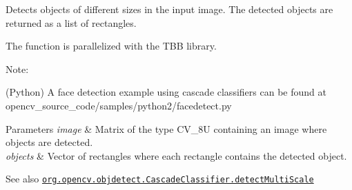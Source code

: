 Detects objects of different sizes in the input image. The detected objects are returned as a list of rectangles.

The function is parallelized with the T\+BB library.

Note\+:


\begin{DoxyItemize}
\item (Python) A face detection example using cascade classifiers can be found at opencv\+\_\+source\+\_\+code/samples/python2/facedetect.\+py 
\end{DoxyItemize}


\begin{DoxyParams}{Parameters}
{\em image} & Matrix of the type {\ttfamily C\+V\+\_\+8U} containing an image where objects are detected. \\
\hline
{\em objects} & Vector of rectangles where each rectangle contains the detected object.\\
\hline
\end{DoxyParams}
\begin{DoxySeeAlso}{See also}
\href{http://docs.opencv.org/modules/objdetect/doc/cascade_classification.html#cascadeclassifier-detectmultiscale}{\tt org.\+opencv.\+objdetect.\+Cascade\+Classifier.\+detect\+Multi\+Scale} 
\end{DoxySeeAlso}
\mbox{\label{classorg_1_1opencv_1_1objdetect_1_1_cascade_classifier_ad40f12ae7e118541479558a2b07e4d01}} 
